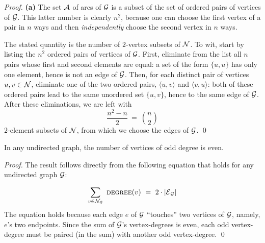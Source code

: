 \begin{proof}
{\bf (a)}
The set $\mbox{$\cal A$}$ of arcs of $\mbox{$\cal G$}$ is a subset of the set of ordered
pairs of vertices of $\mbox{$\cal G$}$.  This latter number is clearly $n^2$, because
one can choose the first vertex of a pair in $n$ ways and then
{\em independently} choose the second vertex in $n$ ways.

\medskip

The stated quantity is the number of $2$-vertex subsets of $\mbox{$\cal N$}$.  To
wit, start by listing the $n^2$ ordered pairs of vertices of $\mbox{$\cal G$}$.
First, eliminate from the list all $n$ pairs whose first and second
elements are equal: a set of the form $\{ u,u\}$ has only one element,
hence is not an edge of $\mbox{$\cal G$}$.  Then, for each distinct pair of vertices
$u, v \in \mbox{$\cal N$}$, eliminate one of the two ordered pairs, $\langle
u,v \rangle$ and $\langle v,u \rangle$: both of these ordered pairs
lead to the same unordered set $\{ u,v\}$, hence to the same edge of
$\mbox{$\cal G$}$.  After these eliminations, we are left with
\[ \frac{n^2 - n}{2} \ = \ {n \choose 2} \]
$2$-element subsets of $\mbox{$\cal N$}$, from which we choose the edges of $\mbox{$\cal G$}$. \qed
\end{proof}


\begin{prop}
\label{thm:even-num-odd-degrees}
In any undirected graph, the number of vertices of odd degree is even.
\end{prop}

\begin{proof}
The result follows directly from the following equation that holds for
any undirected graph $\mbox{$\cal G$}$:

\[ \sum_{v \in {\cal N}_{\cal G}} \ \mbox{\sc degree}(v) \ = \ 2 \cdot |\e_{\cal G}|
\]
The equation holds because each edge $e$ of $\mbox{$\cal G$}$ ``touches'' two vertices
of $\mbox{$\cal G$}$, namely, $e$'s two endpoints.  Since the sum of $\mbox{$\cal G$}$'s
vertex-degrees is even, each odd vertex-degree must be paired (in the sum)
with another odd vertex-degree.  \qed
\end{proof}


\medskip

